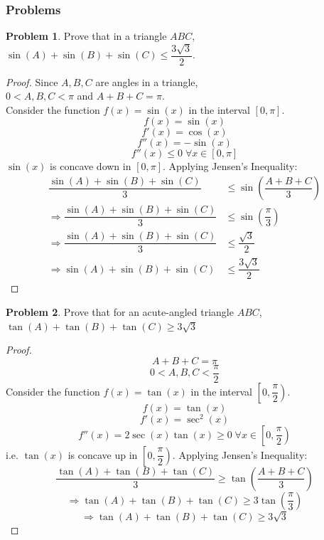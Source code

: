 \documentclass[14]{article}
\theoremstyle{definition}
\newtheorem{prob}{Problem}
\theoremstyle{case}
\begin{document}
\subsubsection{Problems}
\begin{prob}
Prove that in a triangle $ABC$, $\sin(A) + \sin(B) + \sin(C) \leq \dfrac{3\sqrt3}{2}$.\\
\begin{proof}
Since $A, B, C$ are angles in a triangle,\\
$0 < A, B, C < \pi$ and $A + B + C = \pi$.\\
Consider the function $f(x) = \sin(x)$ in the interval $[0, \pi].$
\[f(x) = \sin(x)\]
\[f'(x) = \cos(x)\]
\[f''(x) = -\sin(x)\]
\[f''(x) \leq 0 \; \forall x \in [0, \pi]\]
$\sin(x)$ is concave down in $[0, \pi]$. Applying Jensen's Inequality:
\begin{align*}
\dfrac{\sin(A) + \sin(B)+ \sin(C)}{3} &\leq \sin \left( \dfrac{A+B+C}{3} \right)\\
\Rightarrow \dfrac{\sin(A) + \sin(B)+ \sin(C)}{3} &\leq \sin \left( \dfrac{\pi}{3} \right)\\
\Rightarrow \dfrac{\sin(A) + \sin(B)+ \sin(C)}{3} &\leq \dfrac{\sqrt3}{2}\\
\Rightarrow \sin(A) + \sin(B)+ \sin(C) &\leq \dfrac{3\sqrt3}{2}
\end{align*}
\end{proof}
\end{prob}
\begin{prob}
Prove that for an acute-angled triangle $ABC$, $\tan(A) + \tan(B) + \tan(C) \geq 3\sqrt3$
\end{prob}
\begin{proof}
\[A + B + C = \pi\]
\[0 < A, B, C < \dfrac{\pi}2\]
Consider the function $f(x) = \tan(x)$ in the interval $\left[0, \dfrac{\pi}{2}\right)$.
\[f(x) = \tan(x)\]
\[f'(x) = \sec^2(x)\]
\[f''(x) = 2\sec(x)\tan(x) \geq 0 \; \forall x \in \left[ 0, \dfrac{\pi}{2} \right)\]
i.e. $\tan(x)$ is concave up in $\left[0, \dfrac{\pi}{2}\right)$. Applying Jensen's Inequality:
\[\dfrac{\tan(A) + \tan(B) + \tan(C)}{3} \geq \tan \left( \dfrac{A+B+C}{3} \right)\]
\[\Rightarrow \tan(A) + \tan(B) + \tan(C) \geq 3 \tan \left( \dfrac{\pi}{3} \right)\]
\[\Rightarrow \tan(A) + \tan(B) + \tan(C) \geq 3\sqrt3\]
\end{proof}
\pagebreak
\end{document}
